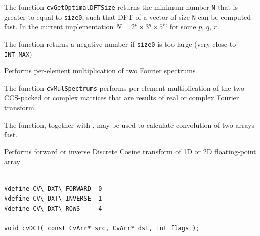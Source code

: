 \begin{description}
\end{description}


The function \texttt{cvGetOptimalDFTSize} returns the minimum number
\texttt{N} that is greater to equal to \texttt{size0}, such that DFT
of a vector of size \texttt{N} can be computed fast. In the current
implementation $N=2^p \times 3^q \times 5^r$` for some $p$, $q$, $r$.

The function returns a negative number if \texttt{size0} is too large
(very close to \texttt{INT\_MAX})


\label{MulSpectrums}

Performs per-element multiplication of two Fourier spectrums


\begin{description}

\end{description}

The function \texttt{cvMulSpectrums} performs per-element multiplication of the two CCS-packed or complex matrices that are results of real or complex Fourier transform.

The function, together with , may be used to calculate convolution of two arrays fast.


\label{DCT}

Performs forward or inverse Discrete Cosine transform of 1D or 2D floating-point array

\begin{lstlisting}

#define CV\_DXT\_FORWARD  0
#define CV\_DXT\_INVERSE  1
#define CV\_DXT\_ROWS     4

void cvDCT( const CvArr* src, CvArr* dst, int flags );

\end{lstlisting}

